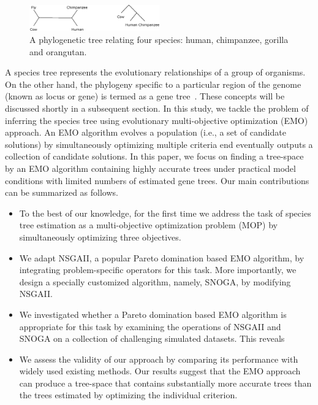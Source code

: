 \begin{figure}[!tb]
	\centering
	\includegraphics[width=0.5\textwidth]{Figure/outgroup.eps}
	\caption{A phylogenetic tree relating four species: human, chimpanzee, gorilla and orangutan. }
	\label{fig:outgroup}
\end{figure}




A species tree represents the evolutionary relationships of a group of organisms. On the other hand, the phylogeny specific to a particular region of the genome (known as locus or gene) is termed as a gene tree~\cite{maddison1997gene}. These concepts will be discussed shortly
in a subsequent section. In this study, we tackle the problem of inferring the species tree using evolutionary multi-objective optimization (EMO) approach. An EMO algorithm evolves a population (i.e., a set of candidate solutions) by simultaneously optimizing multiple criteria end eventually outputs a collection of candidate solutions. In this paper, we focus on finding a tree-space by an EMO algorithm containing highly accurate trees under practical model conditions with limited numbers of estimated gene trees. Our main contributions can be summarized as follows.

\begin{itemize}
	\item To the best of our knowledge, for the first
	time we address the task of species tree estimation as a multi-objective optimization problem (MOP) by simultaneously optimizing three objectives. 
	
	\item We adapt NSGAII, a popular Pareto domination based EMO algorithm, by integrating problem-specific operators for this task. More importantly, we design a specially customized algorithm, namely, SNOGA, by modifying NSGAII.
	
	\item We investigated whether a Pareto domination based EMO algorithm is appropriate for this task by examining the operations of NSGAII and SNOGA on a collection of challenging simulated datasets. This reveals 
	
	\item We assess the validity of our approach by comparing its performance with widely used existing methods. Our results suggest that the EMO approach can produce a tree-space that contains substantially more accurate trees than the trees estimated by optimizing the individual criterion.
\end{itemize}

